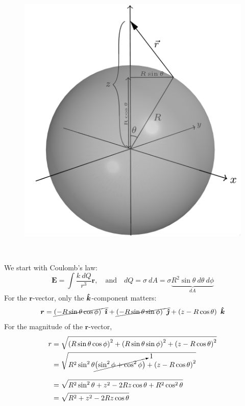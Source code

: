 \documentclass{article}
\begin{document}
\begin{minipage}{0.4\textwidth}
\begin{figure}[H]
\centering
\includegraphics[width=\textwidth]{figures/2l5.png}
\end{figure}
\end{minipage}
~
\begin{minipage}{0.57\textwidth}
We start with Coulomb's law:
\begin{equation*}
    \bm{E} = \int \frac{k\ dQ}{r^3} \bm{r}, \quad \text{and} \quad dQ = \sigma\ dA = \sigma \underbrace{R^2 \sin{\theta}\ d\theta\ d\phi}_{dA}
\end{equation*}
For the $\bm{r}$-vector, only the $\bm{\hat{k}}$-component matters:
\begin{equation*}
    \bm{r} = \cancel{\left( -R\sin{\theta}\cos{\phi} \right)\ \bm{\hat{\imath}}} + \cancel{\left( -R\sin{\theta}\sin{\phi} \right)\ \bm{\hat{\jmath}}} + \left( z - R\cos{\theta} \right)\ \bm{\hat{k}} \\
\end{equation*}
For the magnitude of the $\bm{r}$-vector,
\begin{align*}
    r &= \sqrt{\left( R\sin{\theta}\cos{\phi} \right)^2 + \left( R\sin{\theta}\sin{\phi} \right)^2 + \left( z - R\cos{\theta} \right)^2} \\
      &= \sqrt{ R^2 \sin^2{\theta} \cancelto{1}{\left( \sin^2{\phi} + \cos^2{\phi} \right)} + \left( z - R\cos{\theta} \right)^2} \\[1em]
      &= \sqrt{ R^2 \sin^2{\theta} + z^2 - 2Rz \cos{\theta} + R^2 \cos^2{\theta}} \\
      &= \sqrt{R^2 + z^2 - 2Rz \cos{\theta}}
\end{align*}
\end{minipage}
\end{document}

